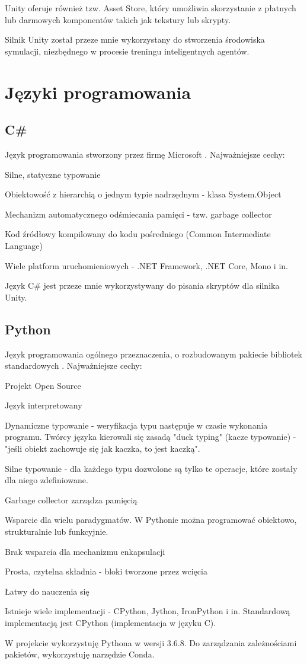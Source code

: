 Unity oferuje również tzw. Asset Store, który umożliwia skorzystanie z płatnych lub darmowych komponentów takich jak tekstury lub skrypty.

Silnik Unity został przeze mnie wykorzystany do stworzenia środowiska symulacji, niezbędnego w procesie treningu inteligentnych agentów.
\section{Języki programowania}
\subsection{C\#}
Język programowania stworzony przez firmę Microsoft \cite{csharp:wikipedia}. Najważniejsze cechy:
\begin{itemize*}
\item Silne, statyczne typowanie
\item Obiektowość z hierarchią o jednym typie nadrzędnym - klasa System.Object
\item Mechanizm automatycznego odśmiecania pamięci - tzw. garbage collector
\item Kod źródłowy kompilowany do kodu pośredniego (Common Intermediate Language)
\item Wiele platform uruchomieniowych - .NET Framework, .NET Core, Mono i in.
\end{itemize*}
Język C\# jest przeze mnie wykorzystywany do pisania skryptów dla silnika Unity.

\subsection{Python}
Język programowania ogólnego przeznaczenia, o rozbudowanym pakiecie bibliotek standardowych 
\cite{python:wikipedia}.
Najważniejsze cechy:
\begin{itemize*}
\item Projekt Open Source
\item Język interpretowany
\item Dynamiczne typowanie - weryfikacja typu następuje w czasie wykonania programu. Twórcy języka kierowali się zasadą "duck typing" (kacze typowanie) - "jeśli obiekt zachowuje się jak kaczka, to jest kaczką".
\item Silne typowanie - dla każdego typu dozwolone są tylko te operacje, które zostały dla niego zdefiniowane.
\item Garbage collector zarządza pamięcią
\item Wsparcie dla wielu paradygmatów. W Pythonie można programować obiektowo, strukturalnie lub funkcyjnie.
\item Brak wsparcia dla mechanizmu enkapsulacji
\item Prosta, czytelna składnia - bloki tworzone przez wcięcia
\item Łatwy do nauczenia się
\item Istnieje wiele implementacji - CPython, Jython, IronPython i in. Standardową implementacją jest CPython (implementacja w języku C).
\end{itemize*}
W projekcie wykorzystuję Pythona w wersji 3.6.8. Do zarządzania zależnościami pakietów, wykorzystuję narzędzie Conda.

